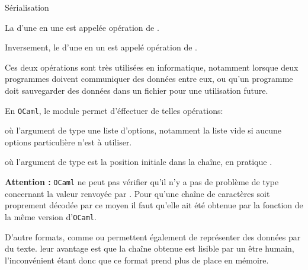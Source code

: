 \documentclass[a4paper,french,bookmarks]{book}
\newcommand{\langOcaml}{\texttt{\color{ocamlColor!20!black}OCaml}}
\begin{document}
    
    \begin{definition}{Sérialisation}{}
        \begin{enumerate}
            \itast La  d'une  en une  est appelée opération de . 
            
            \itast Inversement, le  d'une  en un  est appelé opération de  .
        \end{enumerate}
    \end{definition}
    
    Ces deux opérations sont très utilisées en informatique, notamment lorsque deux programmes doivent communiquer des données entre eux, ou qu'un programme doit sauvegarder des données dans un fichier pour une utilisation future.
    
    \begin{example}{}{}
        En \langOcaml, le module  permet d'éffectuer de telles opérations:
        
        \begin{enumerate}
            \itt {} où l'argument de type  une liste d'options, notamment la liste vide \camlline{[]} si aucune options particulière n'est à utiliser.
                
            \itt {} où l'argument de type  est la position initiale dans la chaîne, en pratique .
        \end{enumerate}
        
    \end{example}
    
    \textbf{\sffamily Attention :} \langOcaml{} ne peut pas vérifier qu'il n'y a pas de problème de type concernant la valeur renvoyée par . Pour qu'une chaîne de caractères soit proprement décodée par ce moyen il faut qu'elle ait été obtenue par la fonction  de la même version d'\langOcaml.
    
    \begin{example}{}{}
        D'autre formats, comme  ou  permettent également de représenter des données par du texte. leur avantage est que la chaîne obtenue est lisible par un être humain, l'inconvénient étant donc que ce format prend plus de place en mémoire. 
    \end{example}
    
\end{document}
